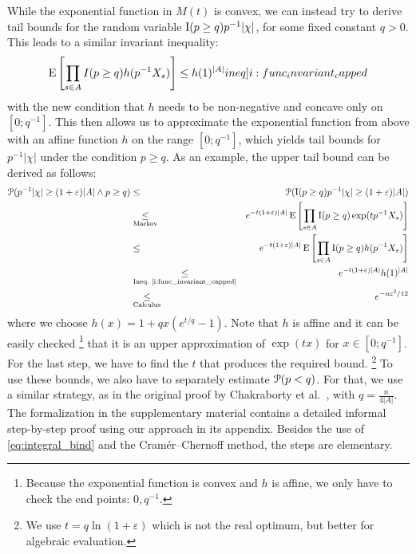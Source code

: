 While the exponential function in $M(t)$ is convex, we can instead try to derive tail bounds for the random variable $\operatorname{\mathrm{I}}(p \geq q) p^{-1} |\chi|$, for some fixed constant $q > 0$.
This leads to a similar invariant inequality:
\begin{align}
  \expect \left[ \prod_{s \in A} I(p \geq q) h(p^{-1} X_s) \right] \leq h(1)^{|A|} \label[ineq]{i:func_invariant_capped}
\end{align}
with the new condition that $h$ needs to be non-negative and concave only on $[0;q^{-1}]$.
This then allows us to approximate the exponential function from above with an affine function $h$ on the range $[0;q^{-1}]$, which yields tail bounds for $p^{-1} |\chi|$ under the condition $p \geq q$. As an example, the upper tail bound can be derived as follows:
\begin{eqnarray*}
  \prob( p^{-1} |\chi| \geq (1+\varepsilon) |A| \wedge p \geq q) & \leq & %
  \prob( \indicat(p \geq q) p^{-1} |\chi| \geq (1+\varepsilon) |A|) \\
  & \underset{\textrm{Markov}}{\leq} & e^{-t(1+\varepsilon) |A|} \expect \left[ \prod_{s \in A} \indicat(p \geq q) \exp( t p^{-1} X_s) \right] \\
  & \leq & e^{-t(1+\varepsilon) |A|} \expect \left[ \prod_{s \in A} \indicat(p \geq q) h(p^{-1} X_s) \right] \\
  & \underset{\textrm{Ineq.~\ref{i:func_invariant_capped}}}{\leq} & e^{-t(1+\varepsilon) |A|} h(1)^{|A|} \\
  & \underset{\textrm{Calculus}}{\leq} & e^{-n\varepsilon^2 / 12}
\end{eqnarray*}
where we choose $h(x) = 1+qx (e^{t/q}-1)$.
Note that $h$ is affine and it can be easily checked%
\footnote{Because the exponential function is convex and $h$ is affine, we only have to check the end points: $0, q^{-1}$.}
that it is an upper approximation of $\exp(tx)$ for $x \in [0;q^{-1}]$.
For the last step, we have to find the $t$ that produces the required bound.%
\footnote{We use $t = q \ln(1+\varepsilon)$ which is not the real optimum, but better for algebraic evaluation.}
To use these bounds, we also have to separately estimate $\operatorname{\mathcal P}(p < q)$.
For that, we use a similar strategy, as in the original proof by Chakraborty et al.~\cite{chakraborty2023}, with $q = \frac{n}{4 |A|}$.
The formalization in the supplementary material contains a detailed informal step-by-step proof using our approach in its appendix.
Besides the use of \cref{eq:integral_bind} and the Cram\'er--Chernoff method, the steps are elementary.

